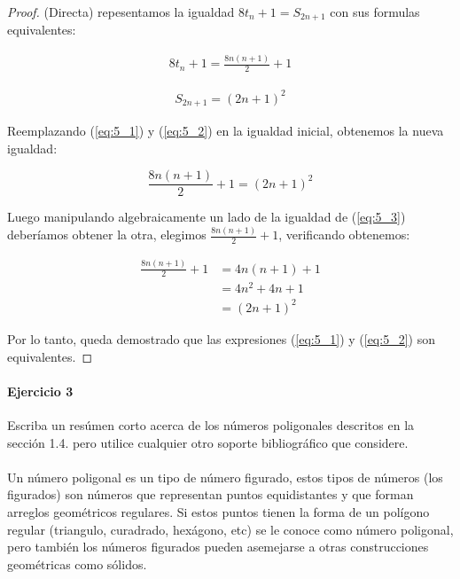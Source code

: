 \documentclass{article}
\begin{document}
\begin{proof}(Directa) repesentamos la igualdad $8t_n + 1 = S_{2n+1}$ con sus formulas equivalentes:

\begin{align} \label{eq:5_1}
    8t_n + 1 = \frac{8n(n+1)}{2} + 1
\end{align}

\begin{align}\label{eq:5_2}
    S_{2n+1} = (2n+1)^2
\end{align}

Reemplazando (\ref{eq:5_1}) y (\ref{eq:5_2}) en la igualdad inicial, obtenemos la nueva igualdad:

\begin{equation}\label{eq:5_3}
    \frac{8n(n+1)}{2} + 1 = (2n+1)^2
\end{equation}

Luego manipulando algebraicamente un lado de la igualdad de (\ref{eq:5_3}) deberíamos obtener la otra, elegimos $\frac{8n(n+1)}{2} + 1$, verificando obtenemos:

\begin{align*}
    \frac{8n(n+1)}{2} + 1 &= 4n(n+1) + 1\\
    &= 4n^2 + 4n +1\\
    &= (2n + 1)^2
\end{align*}

Por lo tanto, queda demostrado que las expresiones (\ref{eq:5_1}) y (\ref{eq:5_2}) son equivalentes.
\end{proof}

\paragraph{Ejercicio 3} Escriba un resúmen corto acerca de los números poligonales descritos en la sección 1.4. pero utilice cualquier otro soporte bibliográfico que considere.

\paragraph{} Un número poligonal es un tipo de número figurado, estos tipos de números (los figurados) son números que representan puntos equidistantes y que forman arreglos geométricos regulares. Si estos puntos tienen la forma de un polígono regular (triangulo, curadrado, hexágono, etc) se le conoce como número poligonal, pero también los números figurados pueden asemejarse a otras construcciones geométricas como sólidos.
\end{document}
